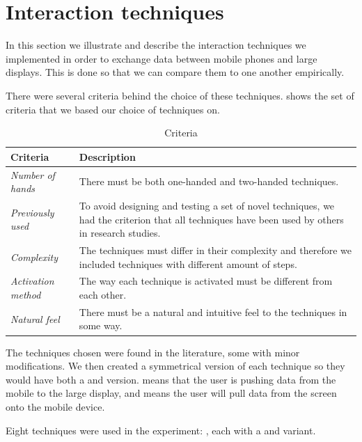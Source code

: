 \section{Interaction techniques} \label{sec:techniques}
In this section we illustrate and describe the interaction techniques we implemented in order to exchange data between mobile phones and large displays.
This is done so that we can compare them to one another empirically.

There were several criteria behind the choice of these techniques. 
 shows the set of criteria that we based our choice of techniques on.

\begin{table}[H]
	\centering
	\def\arraystretch{1.5}
	\begin{tabular}{p{} p{}}
		\hline
		\textbf{Criteria} & \textbf{Description} \\ \hline
		\textit{Number of hands} & There must be both one-handed and two-handed techniques. \\ \hline
		\textit{Previously used} & To avoid designing and testing a set of novel techniques, we had the criterion that all techniques have been used by others in research studies. \\ \hline
		\textit{Complexity} & The techniques must differ in their complexity and therefore we included techniques with different amount of steps. \\ \hline
		\textit{Activation method} & The way each technique is activated must be different from each other. \\ \hline
		\textit{Natural feel} & There must be a natural and intuitive feel to the techniques in some way. \\ \hline
	\end{tabular}
	\caption{Criteria}
	\label{tab:techniqueCriteria}
\end{table}


The techniques chosen were found in the literature, some with minor modifications.
We then created a symmetrical version of each technique so they would have both a \push and \pull version.
\push means that the user is pushing data from the mobile to the large display, and \pull means the user will pull data from the screen onto the mobile device. 

Eight techniques were used in the experiment: \alltechniques, each with a \push and \pull variant.

